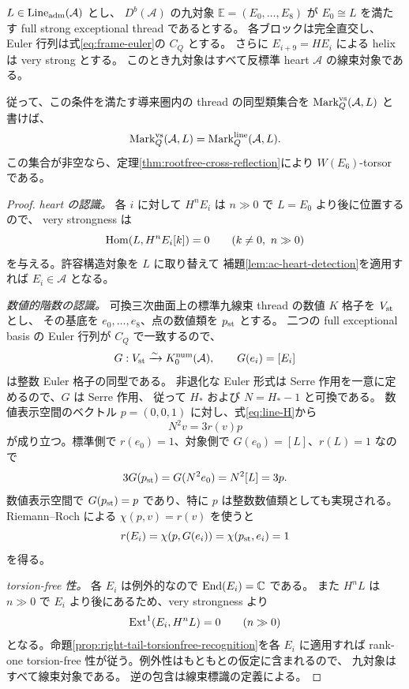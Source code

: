 \begin{theorem}
\label{thm:aou-helix-line-recognition}
$L\in\operatorname{Line}_{\rm adm}(\mathcal A)$ とし、
$D^b(\mathcal A)$ の九対象 $\mathbb E=(E_0,\ldots,E_8)$ が
$E_0\cong L$ を満たす full strong exceptional thread であるとする。
各ブロックは完全直交し、Euler 行列は式\eqref{eq:frame-euler}の $C_Q$ とする。
さらに $E_{i+9}=HE_i$ による helix は very strong とする。
このとき九対象はすべて反標準 heart $\mathcal A$ の線束対象である。

従って、この条件を満たす導来圏内の thread の同型類集合を
$\operatorname{Mark}^{\rm vs}_Q(\mathcal A,L)$ と書けば、
\[
 \operatorname{Mark}^{\rm vs}_Q(\mathcal A,L)
 =\operatorname{Mark}^{\rm line}_Q(\mathcal A,L).
\]
この集合が非空なら、定理\ref{thm:rootfree-cross-reflection}により
$W(E_6)$-torsor である。
\end{theorem}
\begin{proof}
\emph{heart の認識。}
各 $i$ に対して $H^nE_i$ は $n\gg0$ で $L=E_0$ より後に位置するので、
very strongness は
\[
 \operatorname{Hom}(L,H^nE_i[k])=0\qquad(k\ne0,\ n\gg0)
\]
を与える。許容構造対象を $L$ に取り替えて
補題\ref{lem:ac-heart-detection}を適用すれば $E_i\in\mathcal A$ となる。

\emph{数値的階数の認識。}
可換三次曲面上の標準九線束 thread の数値 $K$ 格子を $V_{\rm st}$ とし、
その基底を $e_0,\ldots,e_8$、点の数値類を $p_{\rm st}$ とする。
二つの full exceptional basis の Euler 行列が $C_Q$ で一致するので、
\[
 G:V_{\rm st}\xrightarrow{\sim}K_0^{\rm num}(\mathcal A),
 \qquad G(e_i)=[E_i]
\]
は整数 Euler 格子の同型である。
非退化な Euler 形式は Serre 作用を一意に定めるので、$G$ は Serre 作用、
従って $H_*$ および $N=H_*-1$ と可換である。
数値表示空間のベクトル $p=(0,0,1)$ に対し、式\eqref{eq:line-H}から
\[
 N^2v=3r(v)p
\]
が成り立つ。標準側で $r(e_0)=1$、対象側で $G(e_0)=[L]$、$r(L)=1$ なので
\[
 3G(p_{\rm st})=G(N^2e_0)=N^2[L]=3p.
\]
数値表示空間で $G(p_{\rm st})=p$ であり、特に $p$ は整数数値類としても実現される。
Riemann--Roch による $\chi(p,v)=r(v)$ を使うと
\[
 r(E_i)=\chi(p,G(e_i))
       =\chi(p_{\rm st},e_i)=1
\]
を得る。

\emph{torsion-free 性。}
各 $E_i$ は例外的なので $\operatorname{End}(E_i)=\mathbb C$ である。
また $H^nL$ は $n\gg0$ で $E_i$ より後にあるため、very strongness より
\[
 \operatorname{Ext}^1(E_i,H^nL)=0\qquad(n\gg0)
\]
となる。命題\ref{prop:right-tail-torsionfree-recognition}を各 $E_i$ に適用すれば
rank-one torsion-free 性が従う。例外性はもともとの仮定に含まれるので、
九対象はすべて線束対象である。
逆の包含は線束標識の定義による。
\end{proof}

